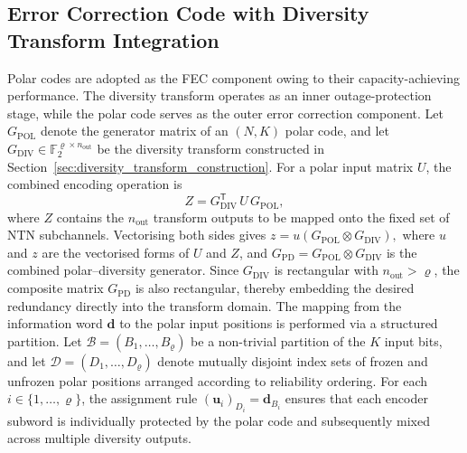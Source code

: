 \documentclass[lettersize,journal]{IEEEtran}
\begin{document}
\subsection{Error Correction Code with Diversity Transform 
Integration}
\label{subsec:polar_diversity}

Polar codes are adopted as the FEC component owing to their capacity-achieving performance. The diversity transform operates as an inner 
outage-protection stage, while the polar code serves as the outer 
error correction component. Let $G_{\text{POL}}$ denote the generator 
matrix of an $(N,K)$ polar code, and let 
$G_{\text{DIV}} \in \mathbb{F}_2^{\varrho \times n_{\text{out}}}$ be 
the diversity transform constructed in 
Section~\ref{sec:diversity_transform_construction}. For a polar input 
matrix $U$, the combined encoding operation is
\begin{equation}
Z = G_{\text{DIV}}^{\mathsf{T}}\, U\, G_{\text{POL}},
\end{equation}
where $Z$ contains the $n_{\text{out}}$ transform outputs to be 
mapped onto the fixed set of NTN subchannels. Vectorising both sides 
gives $ z = u\left(G_{\text{POL}} \otimes G_{\text{DIV}}\right),$
where $u$ and $z$ are the vectorised forms of $U$ and $Z$, and 
$G_{\text{PD}} = G_{\text{POL}} \otimes G_{\text{DIV}}$ is the 
combined polar--diversity generator. Since $G_{\text{DIV}}$ is 
rectangular with $n_{\text{out}} > \varrho$, the composite matrix 
$G_{\text{PD}}$ is also rectangular, thereby embedding the desired 
redundancy directly into the transform domain. The mapping from the 
information word $\mathbf{d}$ to the polar input positions is 
performed via a structured partition. Let 
$\mathcal{B} = (B_1,\ldots,B_\varrho)$ be a non-trivial partition 
of the $K$ input bits, and let 
$\mathcal{D} = (D_1,\ldots,D_\varrho)$ denote mutually disjoint 
index sets of frozen and unfrozen polar positions arranged according 
to reliability ordering. For each $i \in \{1,\ldots,\varrho\}$, 
the assignment rule $(\mathbf{u}_i)_{D_i} = \mathbf{d}_{B_i}$ ensures that each encoder subword is individually protected by the 
polar code and subsequently mixed across multiple diversity outputs.
\end{document}
